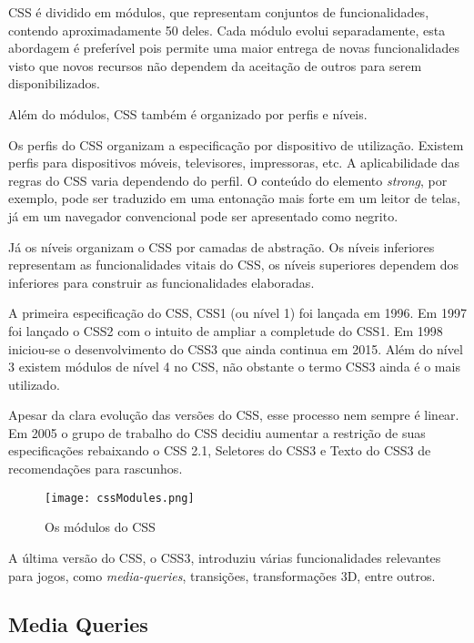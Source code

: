 CSS é dividido em módulos, que representam conjuntos de
funcionalidades, contendo aproximadamente 50 deles. Cada módulo evolui
separadamente, esta abordagem é preferível pois permite uma maior
entrega de novas funcionalidades visto que novos recursos não dependem
da aceitação de outros para serem disponibilizados.

Além do módulos, CSS também é organizado por perfis e níveis.

Os perfis do CSS organizam a especificação por dispositivo de
utilização. Existem perfis para dispositivos móveis, televisores,
impressoras, etc. A aplicabilidade das regras do CSS varia dependendo do
perfil. O conteúdo do elemento \textit{strong}, por exemplo, pode ser
traduzido em uma entonação mais forte em um leitor de telas, já em um
navegador convencional pode ser apresentado como negrito.

Já os níveis organizam o CSS por camadas de abstração. Os níveis
inferiores representam as funcionalidades vitais do CSS, os níveis
superiores dependem dos inferiores para construir as funcionalidades
elaboradas. %

A primeira especificação do CSS, CSS1 (ou nível 1) foi lançada em
1996. Em 1997 foi lançado o CSS2 com o intuito de ampliar a completude
do CSS1. Em 1998 iniciou-se o desenvolvimento do CSS3 que ainda continua
em 2015. Além do nível 3 existem módulos de nível 4 no CSS, não
obstante o termo CSS3 ainda é o mais utilizado.

Apesar da clara evolução das versões do CSS, esse processo nem
sempre é linear. Em 2005 o grupo de trabalho do CSS decidiu aumentar a
restrição de suas especificações rebaixando o CSS 2.1, Seletores do
CSS3 e Texto do CSS3 de recomendações para rascunhos.

\begin{figure}[H]
    \centering
    \texttt{[image: cssModules.png]}
    \caption{Os módulos do CSS}
\end{figure}

A última versão do CSS, o CSS3, introduziu várias funcionalidades
relevantes para jogos, como \textit{media-queries}, transições,
transformações 3D, entre outros.

\subsection{Media Queries}

